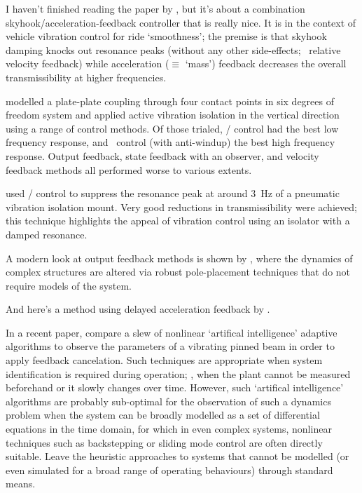 I haven't finished reading the paper by \textcite{savaresi2007}, but
it's about a combination skyhook/acceleration-feedback controller that
is really nice.
It is in the context of vehicle vibration control for
ride `smoothness'; the premise is that skyhook damping knocks out
resonance peaks (without any other side-effects; \cf\ relative
velocity feedback) while acceleration ($\equiv$ `mass') feedback
decreases the overall transmissibility at higher frequencies.



\textcite{kerber2007} modelled a plate-plate coupling through four contact points in six degrees of freedom system and applied active vibration isolation in the vertical direction using a range of control methods.
Of those trialed, \Hinf/ control had the best low frequency response, and \PI\ control (with anti-windup) the best high frequency response.
Output feedback, state feedback with an observer, and velocity feedback methods all performed worse to various extents.

\textcite{chen2007} used \Hinf/ control to suppress the resonance peak at around \SI{3}{Hz} of a pneumatic vibration isolation mount.
Very good reductions in transmissibility were achieved; this technique highlights the appeal of vibration control using an isolator with a damped resonance.

A modern look at output feedback methods is shown by \cite{mottershead2008}, where the dynamics of complex structures are altered via robust pole-placement techniques that do not require models of the system.

And here's a method using delayed acceleration feedback by \textcite{chatterjee2008}.

In a recent paper, \textcite{madkour2007} compare a slew of nonlinear `artifical intelligence' adaptive algorithms to observe the parameters of a vibrating pinned beam in order to apply feedback cancelation.
Such techniques are appropriate when system identification is required during operation; \ie, when the plant cannot be measured beforehand or it slowly changes over time.
However, such `artifical intelligence' algorithms are probably sub-optimal for the observation of such a dynamics problem when the system can be broadly modelled as a set of differential equations in the time domain, for which in even complex systems, nonlinear techniques such as backstepping or sliding mode control are often directly suitable.
Leave the heuristic approaches to systems that cannot be modelled (or even simulated for a broad range of operating behaviours) through standard means.
  

